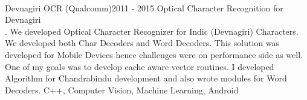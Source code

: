 \begin{projects}
	\project
	{\\Devnagiri OCR (Qualcomm)}{2011 - 2015}
	{Optical Character Recognition for Devnagiri}
	{\\. We developed Optical Character Recognizer for Indic (Devnagiri) Characters. We developed both Char Decoders and Word Decoders. This solution was developed for Mobile Devices hence challenges were on performance side as well. One of my goals was to develop cache aware vector routines. I developed Algorithm for Chandrabindu development and also wrote modules for Word Decoders.}
	{C++, Computer Vision, Machine Learning, Android}	

\end{projects}